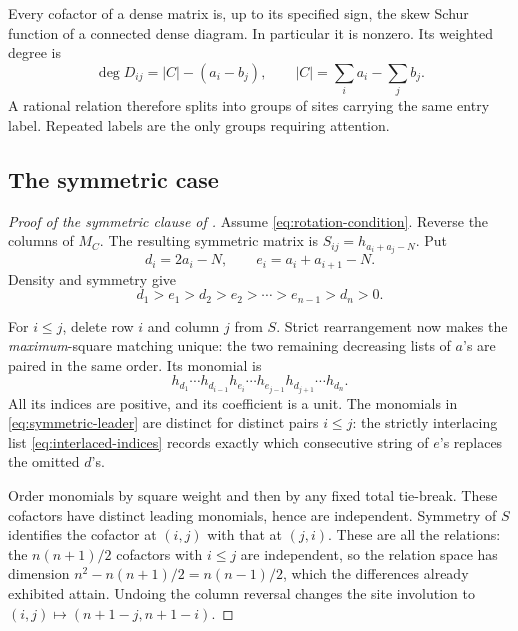 \documentclass[11pt,a4paper]{amsart}
\numberwithin{equation}{section}
\theoremstyle{plain}
\theoremstyle{definition}
\begin{document}
Every cofactor of a dense matrix is, up to its specified sign, the skew Schur
function of a connected dense diagram.  In particular it is nonzero.
Its weighted degree is
\begin{equation}\label{eq:cofactor-degree}
 \deg D_{ij}=|C|-(a_i-b_j),\qquad
 |C|=\sum_i a_i-\sum_j b_j.
\end{equation}
A rational relation therefore splits into groups of sites carrying the same
entry label.  Repeated labels are the only groups requiring attention.

\subsection{The symmetric case}

\begin{proof}[Proof of the symmetric clause of ]
Assume \eqref{eq:rotation-condition}.  Reverse the columns of \(M_C\).
The resulting symmetric matrix is \(S_{ij}=h_{a_i+a_j-N}\).
Put
\[
 d_i=2a_i-N,\qquad e_i=a_i+a_{i+1}-N.
\]
Density and symmetry give
\begin{equation}\label{eq:interlaced-indices}
 d_1>e_1>d_2>e_2>\cdots>e_{n-1}>d_n>0.
\end{equation}

For \(i\le j\), delete row \(i\) and column \(j\) from \(S\).
Strict rearrangement now makes the \emph{maximum}-square matching unique:
the two remaining decreasing lists of \(a\)'s are paired in the same order.
Its monomial is
\begin{equation}\label{eq:symmetric-leader}
 h_{d_1}\cdots h_{d_{i-1}}
 h_{e_i}\cdots h_{e_{j-1}}
 h_{d_{j+1}}\cdots h_{d_n}.
\end{equation}
All its indices are positive, and its coefficient is a unit.
The monomials in \eqref{eq:symmetric-leader} are distinct for distinct pairs
\(i\le j\): the strictly interlacing list
\eqref{eq:interlaced-indices} records exactly which consecutive string of
\(e\)'s replaces the omitted \(d\)'s.

Order monomials by square weight and then by any fixed total tie-break.
These cofactors have distinct leading monomials, hence are independent.
Symmetry of \(S\) identifies the cofactor at \((i,j)\) with that at
\((j,i)\).  These are all the relations: the \(n(n+1)/2\) cofactors with
\(i\le j\) are independent, so the relation space has dimension
\(n^2-n(n+1)/2=n(n-1)/2\), which the differences already exhibited attain.
Undoing the column reversal changes
the site involution to
\((i,j)\mapsto(n+1-j,n+1-i)\).
\end{proof}
\end{document}
